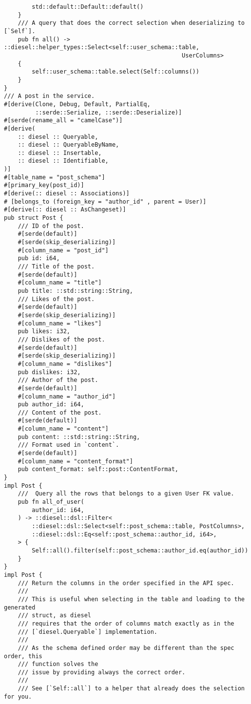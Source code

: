 \begin{verbatim}
        std::default::Default::default()
    }
    /// A query that does the correct selection when deserializing to [`Self`].
    pub fn all() -> ::diesel::helper_types::Select<self::user_schema::table,
                                                   UserColumns>
    {
        self::user_schema::table.select(Self::columns())
    }
}
/// A post in the service.
#[derive(Clone, Debug, Default, PartialEq,
         ::serde::Serialize, ::serde::Deserialize)]
#[serde(rename_all = "camelCase")]
#[derive(
    :: diesel :: Queryable,
    :: diesel :: QueryableByName,
    :: diesel :: Insertable,
    :: diesel :: Identifiable,
)]
#[table_name = "post_schema"]
#[primary_key(post_id)]
#[derive(:: diesel :: Associations)]
# [belongs_to (foreign_key = "author_id" , parent = User)]
#[derive(:: diesel :: AsChangeset)]
pub struct Post {
    /// ID of the post.
    #[serde(default)]
    #[serde(skip_deserializing)]
    #[column_name = "post_id"]
    pub id: i64,
    /// Title of the post.
    #[serde(default)]
    #[column_name = "title"]
    pub title: ::std::string::String,
    /// Likes of the post.
    #[serde(default)]
    #[serde(skip_deserializing)]
    #[column_name = "likes"]
    pub likes: i32,
    /// Dislikes of the post.
    #[serde(default)]
    #[serde(skip_deserializing)]
    #[column_name = "dislikes"]
    pub dislikes: i32,
    /// Author of the post.
    #[serde(default)]
    #[column_name = "author_id"]
    pub author_id: i64,
    /// Content of the post.
    #[serde(default)]
    #[column_name = "content"]
    pub content: ::std::string::String,
    /// Format used in `content`.
    #[serde(default)]
    #[column_name = "content_format"]
    pub content_format: self::post::ContentFormat,
}
impl Post {
    ///  Query all the rows that belongs to a given User FK value.
    pub fn all_of_user(
        author_id: i64,
    ) -> ::diesel::dsl::Filter<
        ::diesel::dsl::Select<self::post_schema::table, PostColumns>,
        ::diesel::dsl::Eq<self::post_schema::author_id, i64>,
    > {
        Self::all().filter(self::post_schema::author_id.eq(author_id))
    }
}
impl Post {
    /// Return the columns in the order specified in the API spec.
    ///
    /// This is useful when selecting in the table and loading to the generated
    /// struct, as diesel
    /// requires that the order of columns match exactly as in the
    /// [`diesel.Queryable`] implementation.
    ///
    /// As the schema defined order may be different than the spec order, this
    /// function solves the
    /// issue by providing always the correct order.
    ///
    /// See [`Self::all`] to a helper that already does the selection for you.

\end{verbatim}
